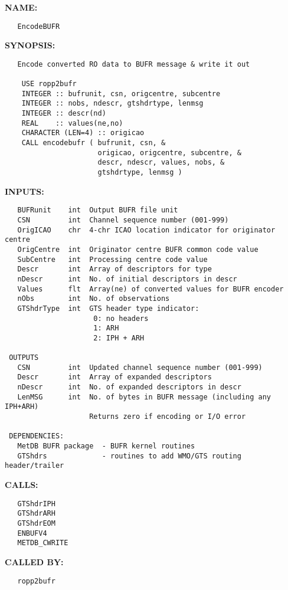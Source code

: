 \label{ch:robo100}
\label{ch:ropp2bufr_EncodeBUFR_mo}
\textbf{NAME:}\hspace{0.08in}\begin{Verbatim}
   EncodeBUFR
\end{Verbatim}
\textbf{SYNOPSIS:}\hspace{0.08in}\begin{Verbatim}
   Encode converted RO data to BUFR message & write it out

    USE ropp2bufr
    INTEGER :: bufrunit, csn, origcentre, subcentre
    INTEGER :: nobs, ndescr, gtshdrtype, lenmsg
    INTEGER :: descr(nd)
    REAL    :: values(ne,no)
    CHARACTER (LEN=4) :: origicao
    CALL encodebufr ( bufrunit, csn, &
                      origicao, origcentre, subcentre, &
                      descr, ndescr, values, nobs, &
                      gtshdrtype, lenmsg )
\end{Verbatim}
\textbf{INPUTS:}\hspace{0.08in}\begin{Verbatim}
   BUFRunit    int  Output BUFR file unit
   CSN         int  Channel sequence number (001-999)
   OrigICAO    chr  4-chr ICAO location indicator for originator centre
   OrigCentre  int  Originator centre BUFR common code value
   SubCentre   int  Processing centre code value
   Descr       int  Array of descriptors for type
   nDescr      int  No. of initial descriptors in descr
   Values      flt  Array(ne) of converted values for BUFR encoder
   nObs        int  No. of observations
   GTShdrType  int  GTS header type indicator:
                     0: no headers
                     1: ARH
                     2: IPH + ARH

 OUTPUTS
   CSN         int  Updated channel sequence number (001-999)
   Descr       int  Array of expanded descriptors
   nDescr      int  No. of expanded descriptors in descr
   LenMSG      int  No. of bytes in BUFR message (including any IPH+ARH)
                    Returns zero if encoding or I/O error

 DEPENDENCIES:
   MetDB BUFR package  - BUFR kernel routines
   GTShdrs             - routines to add WMO/GTS routing header/trailer
\end{Verbatim}
\textbf{CALLS:}\hspace{0.08in}\begin{Verbatim}
   GTShdrIPH
   GTShdrARH
   GTShdrEOM
   ENBUFV4
   METDB_CWRITE
\end{Verbatim}
\textbf{CALLED BY:}\hspace{0.08in}\begin{Verbatim}
   ropp2bufr
\end{Verbatim}
